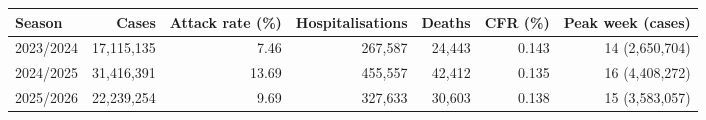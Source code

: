 \begin{tabular}{lrrrrrr}
\toprule
Season & Cases & Attack rate (\%) & Hospitalisations & Deaths & CFR (\%) & Peak week (cases) \\
\midrule
2023/2024 & 17,115,135 & 7.46 & 267,587 & 24,443 & 0.143 & 14 (2,650,704) \\
2024/2025 & 31,416,391 & 13.69 & 455,557 & 42,412 & 0.135 & 16 (4,408,272) \\
2025/2026 & 22,239,254 & 9.69 & 327,633 & 30,603 & 0.138 & 15 (3,583,057) \\
\bottomrule
\end{tabular}
